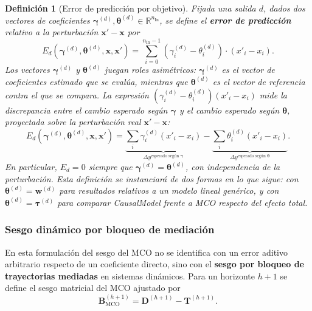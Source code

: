 \documentclass[12pt]{report} %
\newtheorem{definition}{Definición}
\begin{document}
\begin{definition}[Error de predicción por objetivo]
    Fijada una salida $d$, dados dos vectores de coeficientes $\boldsymbol{\gamma}^{(d)}, \boldsymbol{\theta}^{(d)} \in \mathbb{R}^{n_{\text{In}}}$, se define el \textbf{error de predicción} relativo a la perturbación $\mathbf{x}' - \mathbf{x}$ por
    $$E_d(\boldsymbol{\gamma}^{(d)}, \boldsymbol{\theta}^{(d)}, \mathbf{x}, \mathbf{x}') = \sum_{i=0}^{n_{\text{In}}-1} (\gamma_i^{(d)} - \theta_i^{(d)}) \cdot (x'_i - x_i).$$
    Los vectores $\boldsymbol{\gamma}^{(d)}$ y $\boldsymbol{\theta}^{(d)}$ juegan roles asimétricos: $\boldsymbol{\gamma}^{(d)}$ es el vector de coeficientes \emph{estimado} que se evalúa, mientras que $\boldsymbol{\theta}^{(d)}$ es el vector de \emph{referencia} contra el que se compara. La expresión $(\gamma_i^{(d)} - \theta_i^{(d)})(x'_i - x_i)$ mide la discrepancia entre el cambio esperado según $\boldsymbol{\gamma}$ y el cambio esperado según $\boldsymbol{\theta}$, proyectada sobre la perturbación real $\mathbf{x}' - \mathbf{x}$:
    $$E_d(\boldsymbol{\gamma}^{(d)}, \boldsymbol{\theta}^{(d)}, \mathbf{x}, \mathbf{x}') = \underbrace{\sum_i \gamma_i^{(d)}(x'_i - x_i)}_{\Delta y^{\text{esperado según }\boldsymbol{\gamma}}} - \underbrace{\sum_i \theta_i^{(d)}(x'_i - x_i)}_{\Delta y^{\text{esperado según }\boldsymbol{\theta}}}.$$
    En particular, $E_d = 0$ siempre que $\boldsymbol{\gamma}^{(d)} = \boldsymbol{\theta}^{(d)}$, con independencia de la perturbación. Esta definición se instanciará de dos formas en lo que sigue: con $\boldsymbol{\theta}^{(d)} = \mathbf{w}^{(d)}$ para resultados relativos a un modelo lineal genérico, y con $\boldsymbol{\theta}^{(d)} = \boldsymbol{\tau}^{(d)}$ para comparar CausalModel frente a MCO respecto del \emph{efecto total}.
\end{definition}

\subsubsection{Sesgo dinámico por bloqueo de mediación}

En esta formulación del sesgo del MCO no se identifica con un error aditivo arbitrario respecto de un coeficiente directo, sino con el \textbf{sesgo por bloqueo de trayectorias mediadas} en sistemas dinámicos. Para un horizonte $h+1$ se define el sesgo matricial del MCO ajustado por
\begin{equation}
    \mathbf{B}_{\mathrm{MCO}}^{(h+1)} = \mathbf{D}^{(h+1)} - \mathbf{T}^{(h+1)}.
    \label{eq:formal_mco_bias_matrix}
\end{equation}
\end{document}
